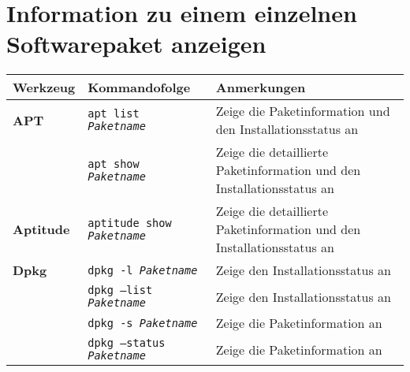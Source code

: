 \documentclass[10pt]{article}
\begin{document}
\section{Information zu einem einzelnen Softwarepaket anzeigen}
\begin{tabular}{ p{3.5cm} p{9cm} p{11cm}}
  \hline
  \rowcolor{Gray}
  \textbf{Werkzeug} & \textbf{Kommandofolge} & \textbf{Anmerkungen} \\
  \hline 
  \textbf{APT} & \texttt{apt list \textit{Paketname}} & Zeige die Paketinformation und den Installationsstatus an \\
  \rowcolor{Gray}
  & \texttt{apt show \textit{Paketname}} & Zeige die detaillierte Paketinformation und den Installationsstatus an \\
  \textbf{Aptitude} & \texttt{aptitude show \textit{Paketname}} & Zeige die detaillierte Paketinformation und den Installationsstatus an \\
  \textbf{Dpkg} & \texttt{dpkg -l \textit{Paketname} } & Zeige den Installationsstatus an \\
  \rowcolor{Gray}
  & \texttt{dpkg --list \textit{Paketname} } & Zeige den Installationsstatus an\\
  & \texttt{dpkg -s \textit{Paketname} } & Zeige die Paketinformation an\\
  \rowcolor{Gray}
  & \texttt{dpkg --status \textit{Paketname} } & Zeige die Paketinformation an\\
  \hline
\end{tabular}
\end{document}
